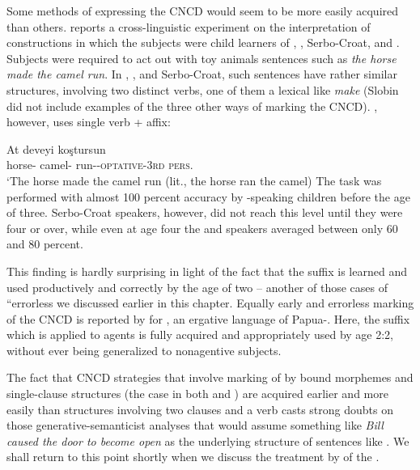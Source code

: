 Some methods of expressing the CNCD would seem to be more easily acquired than others. \citet{Slobin1978} reports a cross-linguistic experiment on the interpretation of  constructions in which the subjects were child learners of , , Serbo-Croat, and . Subjects were required to act out with toy animals sentences such as \textit{the horse made the camel run}. In , , and Serbo-Croat, such sentences have rather similar structures, involving two distinct verbs, one of them a lexical  like \textit{make} (Slobin did not
include examples of the three other  ways of marking the CNCD). , however, uses single verb + affix:

\ea\label{ex:3:76}
\gll At deveyi koştursun\\
{horse-\NOM} {camel-\ACC} {run-\textsc{-optative-3rd pers.}}\\
\glt `The horse made the camel run (lit., the horse ran the camel)
\z
The task was performed with almost 100 percent accuracy by -speaking children before the age of three. Serbo-Croat speakers, however, did not reach this level until they were four or over, while even at age four the  and  speakers averaged between only 60 and 80 percent.

This finding is hardly surprising in light of the fact that the   suffix is learned and used productively and correctly by the age of two -- another of those cases of ``errorless  we discussed earlier in this chapter. Equally early and errorless marking of the CNCD is reported by \citet{Schiefflin1979} for , an ergative language of Papua-. Here, the suffix which is applied to  agents is fully acquired and appropriately used by age 2:2, without ever being generalized to nonagentive subjects.

The fact that CNCD strategies that involve marking of  by bound morphemes and single-clause structures (the case in both  and ) are acquired earlier and more easily than struc\-tures involving two clauses and a  verb casts strong doubts on those generative-semanticist analyses that would assume something like \textit{Bill caused the door to become open} as the underlying structure of sentences like . We shall return to this point shortly when we discuss the treatment by \citet{Bowerman1974} of the   .

